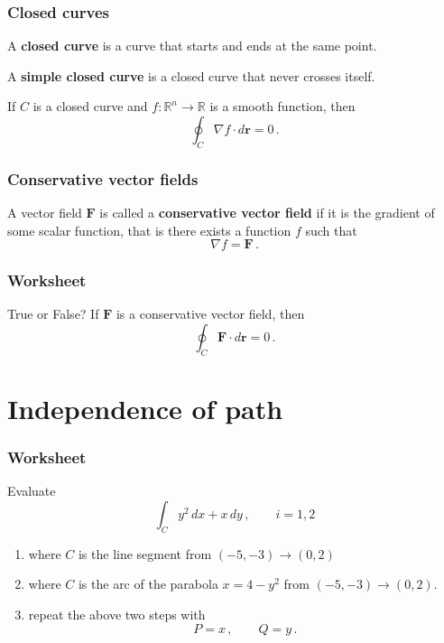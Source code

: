 \documentclass[aspectratio=169]{beamer}
\begin{document}
\begin{frame}
    \frametitle{Closed curves}
    \begin{definition}
    A \textbf{closed curve} is a curve that starts and ends at the same point.

    A \textbf{simple closed curve} is a closed curve that never crosses itself.
    \end{definition}
\end{frame}

\begin{frame}
\begin{corollary}
If \(C\) is a closed curve and \(f:\mathbb{R}^n \to \mathbb{R}\) is a smooth function,
then
\begin{equation*}
    \oint_C \nabla f \cdot d\mathbf{r}  = 0 \,.
\end{equation*}
\end{corollary}
\end{frame}

\begin{frame}
    \frametitle{Conservative vector fields}
\begin{definition}
A vector field \(\mathbf{F}\) is called a \textbf{conservative vector field}
if it is the gradient of some scalar function, that is there exists
a function \(f\) such that
\begin{equation*}
    \nabla f = \mathbf{F} \,.
\end{equation*}
\end{definition}
\end{frame}

\begin{frame}
    \frametitle{Worksheet}
         True or False? 
If \(\mathbf{F}\) is a conservative vector field, then
\begin{equation*}
    \oint_C \mathbf{F} \cdot d\mathbf{r} = 0 \,.
\end{equation*}

\end{frame}

\section{Independence of path}

\begin{frame}
    \frametitle{Worksheet}
    Evaluate
    \begin{equation*}
        \int_{C} y^2 \, dx + x\, dy \,, \qquad i = 1,2
    \end{equation*}
    \begin{enumerate}
        \item where \(C\) is the line segment from \((-5,-3) \to (0,2)\) 
        \item where \(C\) is the arc of the parabola \(x = 4-y^2\) from \((-5,-3) \to (0,2)\).
        \item repeat the above two steps with 
            \begin{equation*}
                P = x\,, \qquad Q = y \,.
            \end{equation*}
    \end{enumerate}
\end{frame}
\end{document}
